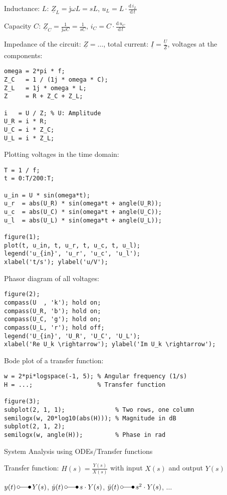 \documentclass[a4paper,fontsize=11pt,parskip]{scrartcl}
\begin{document}
Inductance: $L$: $\underline Z_L = \mathrm{j}\omega L=sL$, $u_L = L\cdot\frac{\mathrm{d}\,i_L}{\mathrm{d}\,t}$

Capacity $C$: $\underline Z_C = \frac{1}{\mathrm{j}\omega C}=\frac{1}{sC}$, $i_C = C\cdot\frac{\mathrm{d}\,u_C}{\mathrm{d}\,t}$

Impedance of the circuit: $\underline Z = \dots$, total current: $\underline I = \frac{\underline U}{\underline Z}$, voltages at the components:
\begin{lstlisting}
omega = 2*pi * f;
Z_C   = 1 / (1j * omega * C);
Z_L   = 1j * omega * L;
Z     = R + Z_C + Z_L;

i   = U / Z; % U: Amplitude
U_R = i * R;
U_C = i * Z_C;
U_L = i * Z_L;
\end{lstlisting}

Plotting voltages in the time domain:
\begin{lstlisting}
T = 1 / f;
t = 0:T/200:T;

u_in = U * sin(omega*t);
u_r  = abs(U_R) * sin(omega*t + angle(U_R));
u_c  = abs(U_C) * sin(omega*t + angle(U_C));
u_l  = abs(U_L) * sin(omega*t + angle(U_L));

figure(1);
plot(t, u_in, t, u_r, t, u_c, t, u_l);
legend('u_{in}', 'u_r', 'u_c', 'u_l');
xlabel('t/s'); ylabel('u/V');
\end{lstlisting}

Phasor diagram of all voltages:
\begin{lstlisting}
figure(2);
compass(U  , 'k'); hold on;
compass(U_R, 'b'); hold on;
compass(U_C, 'g'); hold on;
compass(U_L, 'r'); hold off;
legend('U_{in}', 'U_R', 'U_C', 'U_L');
xlabel('Re U_k \rightarrow'); ylabel('Im U_k \rightarrow');
\end{lstlisting}

Bode plot of a transfer function:
\begin{lstlisting}
w = 2*pi*logspace(-1, 5); % Angular frequency (1/s)
H = ...;                  % Transfer function

figure(3);
subplot(2, 1, 1);              % Two rows, one column
semilogx(w, 20*log10(abs(H))); % Magnitude in dB
subplot(2, 1, 2);
semilogx(w, angle(H));         % Phase in rad
\end{lstlisting}

{\Large System Analysis using ODEs/Transfer functions}

Transfer function: $H(s) = \frac{Y(s)}{X(s)}$ with input $X(s)$ and output $Y(s)$

$y(t)\,\laplace\,Y(s)$, $\dot y(t)\,\laplace\,s\cdot Y(s)$, $\ddot y(t)\,\laplace\,s^2\cdot Y(s)$, $\dots$
\end{document}
